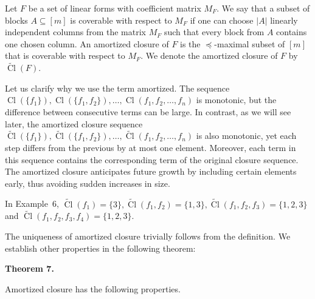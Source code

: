 Let $F$ be a set of linear forms with coefficient matrix $M_{F}$. We say that a subset of blocks $A\subseteq[m]$ is coverable with respect to $M_{F}$ if one can choose $|A|$ linearly independent columns from the matrix $M_{F}$ such that every block from $A$ contains one chosen column. An amortized closure of $F$ is the $\preceq$-maximal subset of $[m]$ that is coverable with respect to $M_{F}$. We denote the amortized closure of $F$ by $\widetilde{\mathop{\mathrm{Cl}}}(F)$.\par



Let us clarify why we use the term amortized. The sequence $\mathop{\mathrm{Cl}}(\{f_{1}\}),\mathop{\mathrm{Cl}}(\{f_{1},f_{2}\}),\dots,\mathop{\mathrm{Cl}}(f_{1},f_{2},\dots,f_{n})$ is monotonic, but the difference between consecutive terms can be large. In contrast, as we will see later, the amortized closure sequence $\widetilde{\mathop{\mathrm{Cl}}}(\{f_{1}\}),\widetilde{\mathop{\mathrm{Cl}}}(\{f_{1},f_{2}\}),\dots,\widetilde{\mathop{\mathrm{Cl}}}(f_{1},f_{2},\dots,f_{n})$ is also monotonic, yet each step differs from the previous by at most one element. Moreover, each term in this sequence contains the corresponding term of the original closure sequence. The amortized closure anticipates future growth by including certain elements early, thus avoiding sudden increases in size.\par



In Example 6, $\widetilde{\mathop{\mathrm{Cl}}}(f_{1})=\{3\},\widetilde{\mathop{\mathrm{Cl}}}(f_{1},f_{2})=\{1,3\},\widetilde{\mathop{\mathrm{Cl}}}(f_{1},f_{2},f_{3})=\{1,2,3\}$ and $\widetilde{\mathop{\mathrm{Cl}}}(f_{1},f_{2},f_{3},f_{4})=\{1,2,3\}$.\par



The uniqueness of amortized closure trivially follows from the definition. We establish other properties in the following theorem:\par



\par\medskip\noindent\textbf{
Theorem 7.
}\par



Amortized closure has the following properties.\par


